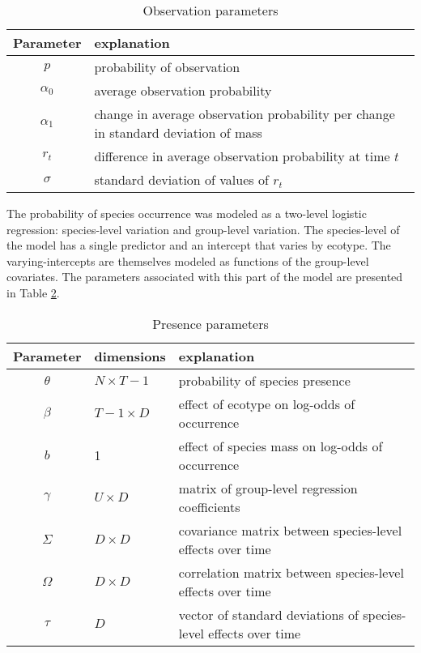 \documentclass[12pt,letterpaper]{article}
\begin{document}
\begin{table}
  \centering
  \begin{tabular}{c l}
    Parameter & explanation \\
    \hline
    \(p\) & probability of observation \\
    \(\alpha_{0}\) & average observation probability \\
    \(\alpha_{1}\) & change in average observation probability per change in standard deviation of mass \\
    \(r_{t}\) & difference in average observation probability at time \(t\) \\
    \(\sigma\) & standard deviation of values of \(r_{t}\) \\
  \end{tabular}
  \caption{Observation parameters}
  \label{tab:obs_param}
\end{table}


The probability of species occurrence was modeled as a two-level logistic regression: species-level variation and group-level variation. The species-level of the model has a single predictor and an intercept that varies by ecotype. The varying-intercepts are themselves modeled as functions of the group-level covariates. The parameters associated with this part of the model are presented in Table \ref{tab:pres_param}.

\begin{table}
  \centering
  \begin{tabular}{c l l}
    Parameter & dimensions & explanation \\
    \hline
    \(\theta\) & \(N \times T - 1\) & probability of species presence \\
    \(\beta\) & \(T - 1 \times D\) & effect of ecotype on log-odds of occurrence \\
    \(b\) & 1 & effect of species mass on log-odds of occurrence \\
    \(\gamma\) & \(U \times D\) & matrix of group-level regression coefficients \\
    \(\Sigma\) & \(D \times D\) & covariance matrix between species-level effects over time \\
    \(\Omega\) & \(D \times D\) & correlation matrix between species-level effects over time \\
    \(\tau\) & \(D\) & vector of standard deviations of species-level effects over time\\
  \end{tabular}
  \caption{Presence parameters}
  \label{tab:pres_param}
\end{table}
\end{document}
